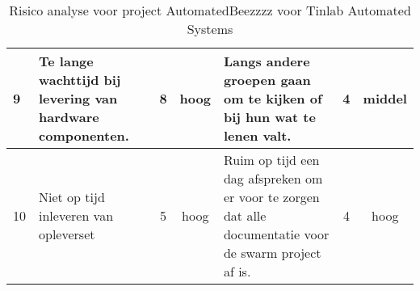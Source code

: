 \begin{landscape}
\begin{table}[ht]
{\begin{tabular}{|l|>{\centering\arraybackslash}m{6cm}|c|c|>{\centering\arraybackslash}m{6cm}|c|c|}
            \hline
            9 & Te lange wachttijd bij levering van hardware componenten. & 8 & \cellcolor{red}hoog & Langs andere groepen gaan om te kijken of bij hun wat te lenen valt. & 4 & \cellcolor{yellow}middel \\
            \hline
            10 & Niet op tijd inleveren van opleverset & 5 & \cellcolor{red}hoog & Ruim op tijd een dag afspreken om er voor te zorgen dat alle documentatie voor de swarm project af is. & 4 & \cellcolor{red}hoog \\
            \hline
            \end{tabular}}
            \caption{Risico analyse voor project AutomatedBeezzzz voor Tinlab Automated Systems}

    \end{table}
\end{landscape}